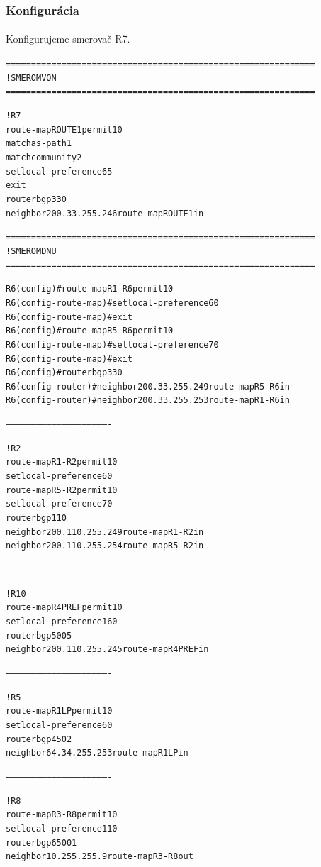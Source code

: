 \documentclass[12pt,twoside,a4paper]{report}
\begin{document}
\subsubsection{Konfigurácia}
\paragraph{}
Konfigurujeme smerovač R7.

\noindent
{\selectfont
\begin{small}
\begin{alltt}
=============================================================
!SMEROM VON
=============================================================

!R7
route-map ROUTE1 permit 10
  match as-path 1
  match community 2
  set local-preference 65
exit
router bgp 330
neighbor 200.33.255.246 route-map ROUTE1 in


=============================================================
!SMEROM DNU
=============================================================

R6(config)#route-map R1-R6 permit 10
R6(config-route-map)#set local-preference 60
R6(config-route-map)#exit
R6(config)#route-map R5-R6 permit 10
R6(config-route-map)#set local-preference 70
R6(config-route-map)#exit
R6(config)#router bgp 330
R6(config-router)#neighbor 200.33.255.249 route-map R5-R6 in
R6(config-router)#neighbor 200.33.255.253 route-map R1-R6 in


-------------------------------------------------------------


!R2
route-map R1-R2 permit 10
  set local-preference 60
route-map R5-R2 permit 10
  set local-preference 70
router bgp 110
  neighbor 200.110.255.249 route-map R1-R2 in
  neighbor 200.110.255.254 route-map R5-R2 in


-------------------------------------------------------------


!R10
route-map R4PREF permit 10
  set local-preference 160
router bgp 5005
  neighbor 200.110.255.245 route-map R4PREF in


-------------------------------------------------------------


!R5
route-map R1LP permit 10
  set local-preference 60
router bgp 4502
  neighbor 64.34.255.253 route-map R1LP in


-------------------------------------------------------------


!R8
route-map R3-R8 permit 10
  set local-preference 110
router bgp 65001
  neighbor 10.255.255.9 route-map R3-R8 out
\end{alltt}
\end{small}
}
\end{document}

